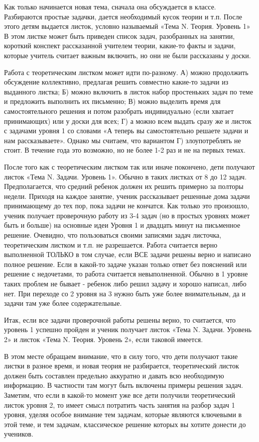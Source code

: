 Как только начинается новая тема, сначала она обсуждается в классе. Разбираются простые задачки, дается необходимый кусок теории и т.п. После этого детям выдается листок, условно называемый «Тема N. Теория. Уровень 1» В этом листке может быть приведен список задач, разобранных на занятии, короткий конспект рассказанной учителем теории, какие-то факты и задачи, которые учитель считает важным включить, но они не были рассказаны у доски. 

Работа с теоретическим листком может идти по-разному. А) можно продолжить обсуждение коллективно, предлагая решить совместно какие-то задачи из выданного листка; Б) можно включить в листок набор простеньких задач по теме и предложить выполнить их письменно; В) можно выделить время для самостоятельного решения и потом разобрать индивидуально (если хватает принимающих) или у доски для всех; Г) а можно всем выдать сразу же и листок с задачами уровня 1 со словами «А теперь вы самостоятельно решаете задачи и нам рассказываете». Однако мы считаем, что вариантом Г) злоупотреблять не стоит. В течение года это возможно, но не более 1-2 раз и не на первых темах.

После того как с теоретическим листком так или иначе покончено, дети получают листок «Тема N. Задачи. Уровень 1». Обычно в таких листках от 8 до 12 задач. Предполагается, что средний ребенок должен их решить примерно за полторы недели. Приходя на каждое занятие, ученик рассказывает решенные дома задачи принимающему до тех пор, пока задачи не кончатся. Как только это произошло, ученик получает проверочную работу из 3-4 задач (но в простых уровнях может быть и больше) на основные идеи Уровня 1 и двадцать минут на письменное решение. Очевидно, что пользоваться своими записями задач листочка, теоретическим листком и т.п. не разрешается. 
Работа считается верно выполненной ТОЛЬКО в том случае, если ВСЕ задачи решены верно и написано полное решение. Если в какой-то задаче указан только ответ без пояснений или решение с недочетами, то работа считается невыполненной. Обычно в 1 уровне таких проблем не бывает - ребенок либо решил задачу и хорошо написал, либо нет. При переходе со 2 уровня на 3 нужно быть уже более внимательным, да и задачи там уже более содержательные.

Итак, если все задачи проверочной работы решены верно, то считается, что уровень 1 успешно пройден и ученик получает листок «Тема N. Задачи. Уровень 2» и листок «Тема N. Теория. Уровень 2», если таковой имеется.

В этом месте обращаем внимание, что в силу того, что дети получают такие листки в разное время, и новая теория не разбирается, теоретический листок должен быть составлен предельно аккуратно и давать всю необходимую информацию. В частности там могут быть включены примеры решения задач. Заметим, что если в какой-то момент уже все дети получили теоретический листок уровня 2, то имеет смысл потратить часть занятия на разбор задач 1 уровня, уделяя особое внимание тем задачам, которые являются ключевыми в этой теме, и тем задачам, классическое решение которых вы хотите донести до учеников.

